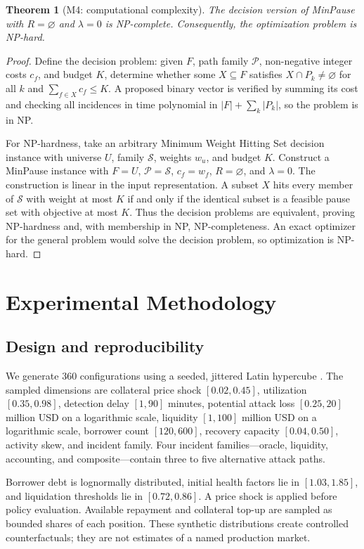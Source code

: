 \documentclass[sn-vancouver,Numbered]{sn-jnl}
\newtheorem{theorem}{Theorem}
\newcommand{\ScenarioCount}{360}
\begin{document}
\begin{theorem}[M4: computational complexity]
The decision version of MinPause with $R=\varnothing$ and $\lambda=0$ is NP-complete. Consequently, the optimization problem is NP-hard.
\end{theorem}
\begin{proof}
Define the decision problem: given $F$, path family $\mathcal P$, non-negative integer costs $c_f$, and budget $K$, determine whether some $X\subseteq F$ satisfies $X\cap P_k\neq\varnothing$ for all $k$ and $\sum_{f\in X}c_f\leq K$. A proposed binary vector is verified by summing its cost and checking all incidences in time polynomial in $|F|+\sum_k|P_k|$, so the problem is in NP.

For NP-hardness, take an arbitrary Minimum Weight Hitting Set decision instance with universe $U$, family $\mathcal S$, weights $w_u$, and budget $K$. Construct a MinPause instance with $F=U$, $\mathcal P=\mathcal S$, $c_f=w_f$, $R=\varnothing$, and $\lambda=0$. The construction is linear in the input representation. A subset $X$ hits every member of $\mathcal S$ with weight at most $K$ if and only if the identical subset is a feasible pause set with objective at most $K$. Thus the decision problems are equivalent, proving NP-hardness and, with membership in NP, NP-completeness. An exact optimizer for the general problem would solve the decision problem, so optimization is NP-hard.
\end{proof}

\section{Experimental Methodology}
\subsection{Design and reproducibility}
We generate \ScenarioCount{} configurations using a seeded, jittered Latin hypercube \cite{mckay1979lhs}. The sampled dimensions are collateral price shock $[0.02,0.45]$, utilization $[0.35,0.98]$, detection delay $[1,90]$ minutes, potential attack loss $[0.25,20]$ million USD on a logarithmic scale, liquidity $[1,100]$ million USD on a logarithmic scale, borrower count $[120,600]$, recovery capacity $[0.04,0.50]$, activity skew, and incident family. Four incident families---oracle, liquidity, accounting, and composite---contain three to five alternative attack paths.

Borrower debt is lognormally distributed, initial health factors lie in $[1.03,1.85]$, and liquidation thresholds lie in $[0.72,0.86]$.  A price shock is applied before policy evaluation.  Available repayment and collateral top-up are sampled as bounded shares of each position.  These synthetic distributions create controlled counterfactuals; they are not estimates of a named production market.
\end{document}
